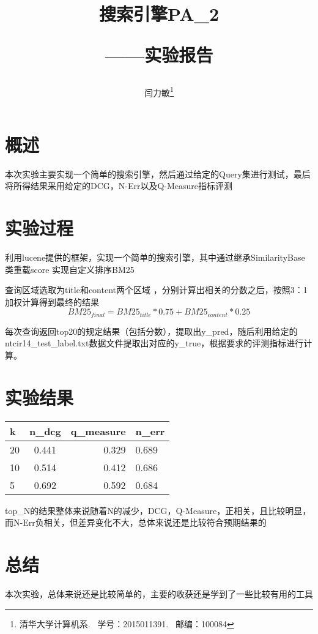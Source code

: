 \documentclass{article}
\begin{document}
\title{搜索引擎PA\_2 \\[1ex]\begin{Large}——实验报告\end{Large}}
\author{闫力敏\thanks{清华大学计算机系.~ 学号：2015011391.~ 邮编：100084}}
\date{}

	\maketitle

	\section{概述}
		本次实验主要实现一个简单的搜索引擎，然后通过给定的Query集进行测试，最后将所得结果采用给定的DCG，N-Err以及Q-Measure指标评测
	\section{实验过程}
		利用lucene提供的框架，实现一个简单的搜索引擎，其中通过继承SimilarityBase类重载score 实现自定义排序BM25
		\par
		查询区域选取为title和content两个区域	，分别计算出相关的分数之后，按照3：1加权计算得到最终的结果
		$$BM25_{final} = BM25_{title} * 0.75 + BM25_{content} * 0.25 $$
		\par
		每次查询返回top20的规定结果（包括分数），提取出y\_pred，随后利用给定的ntcir14\_test\_label.txt数据文件提取出对应的y\_true，根据要求的评测指标进行计算。
	\section{实验结果}
		\begin{tabular}{|l|c|r|l|} 
		\hline 
		k &n\_dcg&q\_measure&n\_err\\
		\hline 
		20 &0.441 &0.329& 0.689\\
		10 &0.514 &0.412& 0.686\\
		5 &0.692 &0.592& 0.684\\
		\hline 
		\end{tabular}
		\par 
		top\_N的结果整体来说随着N的减少，DCG，Q-Measure，正相关，且比较明显，而N-Err负相关，但差异变化不大，总体来说还是比较符合预期结果的

	\section{总结}
		本次实验，总体来说还是比较简单的，主要的收获还是学到了一些比较有用的工具
	
	
\end{document}
